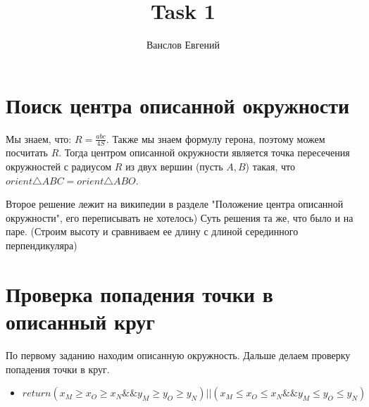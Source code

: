 \documentclass[14pt]{article} %
\title{Task 1}
\author{Ванслов Евгений}
\date{}
\begin{document}
\maketitle
\section{Поиск центра описанной окружности}

Мы знаем, что: $R=\frac{abc}{4S}$.
Также мы знаем формулу герона, поэтому можем посчитать $R$.
Тогда центром описанной окружности является точка пересечения окружностей с радиусом $R$ из двух вершин (пусть $A,B$) такая, что $orient\triangle ABC= orient\triangle ABO$.  

Второе решение лежит на википедии в разделе "Положение центра описанной окружности", его переписывать не хотелось)
Суть решения та же, что было и на паре. (Строим высоту и сравниваем ее длину с длиной серединного перпендикуляра)

\section{Проверка попадения точки в описанный круг}
По первому заданию находим описанную окружность.
Дальше делаем проверку попадения точки в круг.

\begin{itemize}
 любую прямую, пересекающую окружность в двух точках и проходящую через точку ( например, через центр окружности и точку) 
 точки пересечения прямой с окружностью ( $M,N$)
\item $return  (x_M \ge x_O \ge x_N   \&\&  y_M \ge y_O \ge y_N) || (x_M \le x_O \le x_N  \&\&  y_M \le y_O \le y_N) $
\end{itemize}

  
\end{document}
